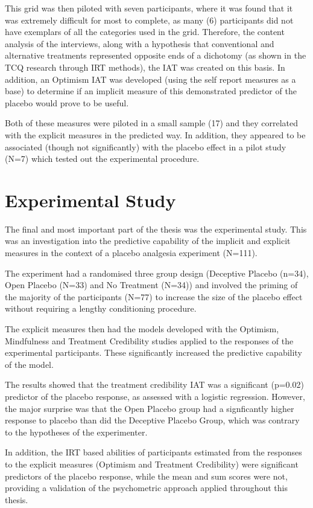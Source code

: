 \documentclass{article}
\begin{document}
This grid was then piloted with seven participants, where it was found that it was extremely difficult for most to complete, as many (6) participants did not have exemplars of all the categories used in the grid. Therefore, the content analysis of the interviews, along with a hypothesis that conventional and alternative treatments represented opposite ends of a dichotomy (as shown in the TCQ research through IRT methods), the IAT was created on this basis. In addition, an Optimism IAT was developed (using the self report measures as a base) to determine if an implicit measure of this demonstrated predictor of the placebo would prove to be useful. 

Both of these measures were piloted in a small sample (17) and they correlated with the explicit measures in the predicted way. In addition, they appeared to be associated (though not significantly) with the placebo effect in a pilot study (N=7) which tested out the experimental procedure.

\section{Experimental Study}
\label{sec:experimental-study}

The final and most important part of the thesis was the experimental study. This was an investigation into the predictive capability of the implicit and explicit measures in the context of a placebo analgesia experiment (N=111). 

The experiment had a randomised three group design (Deceptive Placebo (n=34), Open Placebo (N=33) and No Treatment (N=34)) and involved the priming of the majority of the participants (N=77) to increase the size of the placebo effect without requiring a lengthy conditioning procedure. 

The explicit measures then had the models developed with the Optimism, Mindfulness and Treatment Credibility studies applied to the responses of the experimental participants. These significantly increased the predictive capability of the model.

The results showed that the treatment credibility IAT was a significant (p=0.02) predictor of the placebo response, as assessed with a logistic regression. However, the major surprise was that the Open Placebo group had a signficantly higher response to placebo than did the Deceptive Placebo Group, which was contrary to the hypotheses of the experimenter. 

In addition, the IRT based abilities of participants estimated from the responses to the explicit measures (Optimism and Treatment Credibility) were significant predictors of the placebo response, while the mean and sum scores were not, providing a validation of the psychometric approach applied throughout this thesis. 
\end{document}
